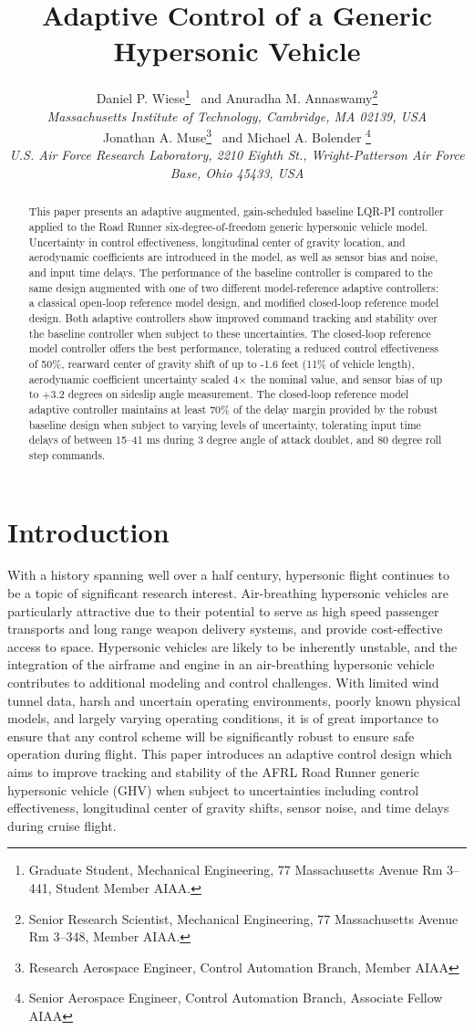 \documentclass[]{../sty/aiaa-tc}
\title{Adaptive Control of a Generic Hypersonic Vehicle}
\author{%
  Daniel P. Wiese\thanks{Graduate Student, Mechanical Engineering, 77 Massachusetts Avenue Rm 3--441, Student Member AIAA.}
  \ and
  Anuradha M. Annaswamy\thanks{Senior Research Scientist, Mechanical Engineering, 77 Massachusetts Avenue Rm 3--348, Member AIAA.}\\
  {\normalsize\itshape{}Massachusetts Institute of Technology, Cambridge, MA 02139, USA}\\[4pt] %
  Jonathan A. Muse\thanks{Research Aerospace Engineer, Control Automation Branch, Member AIAA}
  \ and
  Michael A. Bolender \thanks{Senior Aerospace Engineer, Control Automation Branch, Associate Fellow AIAA}\\
  {\normalsize\itshape{}U.S. Air Force Research Laboratory, 2210 Eighth St., Wright-Patterson Air Force Base, Ohio 45433, USA} %
}
\begin{document}
  \maketitle

  \begin{abstract}
    This paper presents an adaptive augmented, gain-scheduled baseline LQR-PI controller applied to the Road Runner six-degree-of-freedom generic hypersonic vehicle model.
    Uncertainty in control effectiveness, longitudinal center of gravity location, and aerodynamic coefficients are introduced in the model, as well as sensor bias and noise, and input time delays.
    The performance of the baseline controller is compared to the same design augmented with one of two different model-reference adaptive controllers: a classical open-loop reference model design, and modified closed-loop reference model design.
    Both adaptive controllers show improved command tracking and stability over the baseline controller when subject to these uncertainties.
    The closed-loop reference model controller offers the best performance, tolerating a reduced control effectiveness of 50\%, rearward center of gravity shift of up to -1.6 feet (11\% of vehicle length), aerodynamic coefficient uncertainty scaled 4$\times$ the nominal value, and sensor bias of up to $+$3.2 degrees on sideslip angle measurement.
    The closed-loop reference model adaptive controller maintains at least 70\% of the delay margin provided by the robust baseline design when subject to varying levels of uncertainty, tolerating input time delays of between 15--41 ms during 3 degree angle of attack doublet, and 80 degree roll step commands.
  \end{abstract}

  \section{Introduction}

  With a history spanning well over a half century, hypersonic flight continues to be a topic of significant research interest.
  Air-breathing hypersonic vehicles are particularly attractive due to their potential to serve as high speed passenger transports and long range weapon delivery systems, and provide cost-effective access to space.\cite{heppenheimer2009facing}
  Hypersonic vehicles are likely to be inherently unstable,\cite{mirmirani2005airbreathing} and the integration of the airframe and engine in an air-breathing hypersonic vehicle contributes to additional modeling and control challenges.
  With limited wind tunnel data, harsh and uncertain operating environments, poorly known physical models, and largely varying operating conditions, it is of great importance to ensure that any control scheme will be significantly robust to ensure safe operation during flight.
  This paper introduces an adaptive control design which aims to improve tracking and stability of the AFRL Road Runner generic hypersonic vehicle (GHV) when subject to uncertainties including control effectiveness, longitudinal center of gravity shifts, sensor noise, and time delays during cruise flight.
\end{document}
